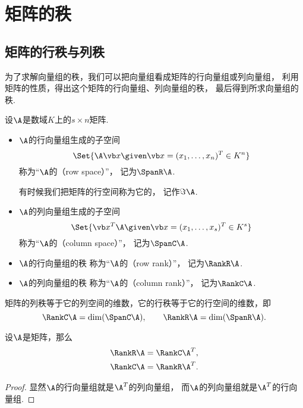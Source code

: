 \section{矩阵的秩}
\subsection{矩阵的行秩与列秩}
为了求解向量组的秩，我们可以把向量组看成矩阵的行向量组或列向量组，
利用矩阵的性质，得出这个矩阵的行向量组、列向量组的秩，
最后得到所求向量组的秩.

\begin{definition}\label{definition:线性方程组.行秩与列秩的定义}
设\(\A\)是数域\(K\)上的\(s \times n\)矩阵.
\begin{itemize}
	\item \(\A\)的行向量组生成的子空间\[
		\Set{
			\A\x \given \x=(x_1,\dotsc,x_n)^T \in K^n
		}
	\]
	称为“\(\A\)的（row space）”，
	记为\(\SpanR\A\).

	有时候我们把矩阵的行空间称为它的，
	记作\(\Im\A\).

	\item \(\A\)的列向量组生成的子空间\[
		\Set{
			\x^T\A \given \x=(x_1,\dotsc,x_s)^T \in K^s
		}
	\]
	称为“\(\A\)的（column space）”，
	记为\(\SpanC\A\).
	\item \(\A\)的行向量组的秩
	称为“\(\A\)的（row rank）”，
	记为\(\RankR\A\).
	\item \(\A\)的列向量组的秩
	称为“\(\A\)的（column rank）”，
	记为\(\RankC\A\).
\end{itemize}
\end{definition}

矩阵的列秩等于它的列空间的维数，它的行秩等于它的行空间的维数，即\[
	\RankC\A=\dim(\SpanC\A), \qquad
	\RankR\A=\dim(\SpanR\A).
\]

\begin{proposition}\label{theorem:向量空间.矩阵的行秩与列秩分别等于它的转置矩阵的列秩与行秩}
设\(\A\)是矩阵，那么\begin{gather}
	\RankR\A=\RankC\A^T, \\
	\RankC\A=\RankR\A^T.
\end{gather}
\begin{proof}
显然\(\A\)的行向量组就是\(\A^T\)的列向量组，
而\(\A\)的列向量组就是\(\A^T\)的行向量组.
\end{proof}
\end{proposition}

